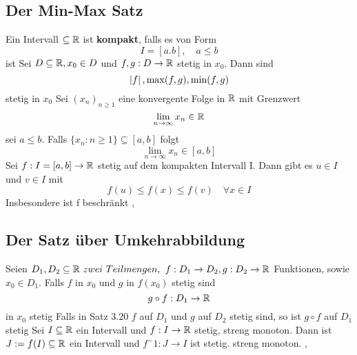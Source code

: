 \subsection{Der Min-Max Satz}
\Def[3.16] Ein Intervall \(\subseteq \mathbb{R}\) ist \textbf{kompakt}, falls es von Form
\[I = [a.b], \quad a \leq b\] ist \newline
\Lemma[3.17] Sei \(D \subseteq \mathbb{R}, x_0 \in D \) und \(f,g : D \rightarrow \mathbb{R} \) stetig in \(x_0\). Dann sind
\[ \left\lvert f \right\rvert, \max(f,g), \min(f,g) \] stetig in \(x_0\) \newline
\Lemma[3.18] Sei \((x_n)_{n \geq 1}\) eine konvergente Folge in \(\mathbb{R}\) mit Grenzwert
\[\lim\limits_{n \rightarrow \infty} x_n \in \mathbb{R} \]
sei \(a \leq b\). Falls \(\{x_n : n \geq 1\} \subseteq [a,b]\) folgt
\[\lim\limits_{n \rightarrow \infty} x_n \in [a,b] \]
\Satz[3.19] Sei \(f : I = [a,b] \rightarrow \mathbb{R} \) stetig auf dem kompakten Intervall I. Dann gibt es \(u \in I \) und \(v \in I\) mit
\[f(u) \leq f(x) \leq f(v) \quad \forall x \in I\]
Insbesondere ist f beschränkt
\sep
\subsection{Der Satz über  Umkehrabbildung} 
\Satz[3.20] Seien \(D_1, D_2 \subseteq \R \ zwei \ Teilmengen,\) \newline \(f: D_1 \rightarrow D_2, g: D_2 \rightarrow \mathbb{R}\) Funktionen, sowie \(x_0 \in D_1\). Falls \(f\) in \(x_0\) und \(g\) in \(f(x_0)\) stetig sind
\[ g \circ f : D_1 \rightarrow \mathbb{R} \]
in \(x_0\) stetig \newline
\Korollar[3.21] Falls in Satz 3.20 \(f\) auf \(D_1\) und \(g\) auf \(D_2\) stetig sind, so ist \(g \circ f\) auf \(D_1\) stetig \newline
\Satz[3.22] Sei \(I \subseteq \mathbb{R}\) ein Intervall und \(f: I \rightarrow \mathbb{R}\) stetig, streng monoton. Dann ist \(J:= f(I) \subseteq \mathbb{R}\) ein Intervall und \(f^-1 : J \rightarrow I \) ist stetig. streng monoton.
\sep
